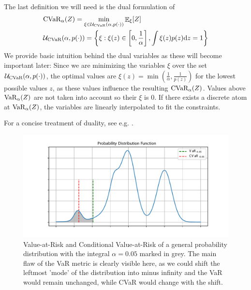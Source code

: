 The last definition we will need is the dual formulation of 
\newcommand{\smallenvelope}{\mathcal{U}_{\cvar}(\alpha, p(\cdot))}
\begin{align}\label{eqn:cvardual}
&\cvar_\alpha(Z)= \min_{\xi \in \smallenvelope}\expect\nolimits_\xi[Z]\\
&\smallenvelope = \braces{\xi : \xi(z) \in \bsquare{0, \frac{1}{\alpha}}, \int \xi(z)p(z) \text{d}z = 1}\label{eqn:envelope}
\end{align}
We provide basic intuition behind the dual variables as these will become important later: Since we are minimizing the variables $\xi$ over the set $\smallenvelope$, the optimal values are $\xi(z) = \min\left(\frac{1}{\alpha}, \frac{1}{p(z)}\right)$ for the lowest possible values $z$, as these 
values influence the resulting $\text{CVaR}_\alpha(Z)$. Values above $\text{VaR}_\alpha(Z)$ are not taken into account so their $\xi$ is $0$. If there exists a discrete atom at $\text{VaR}_\alpha(Z)$, the variables are linearly interpolated to fit the constraints.

For a concise treatment of duality, see e.g. \citet{boyd2004convex}.


\begin{figure}
\center
\includegraphics[width=\linewidth]{gfx/pdf.pdf}
\caption[VaR and CVaR of a general probability distribution.]{Value-at-Risk and Conditional Value-at-Risk of a general probability distribution with the integral $\alpha=0.05$ marked in grey. The main flaw of the VaR metric is clearly visible here, as we could shift the leftmost 'mode' of the distribution into minus infinity and the VaR would remain unchanged, while CVaR would change with the shift.}
\end{figure}





